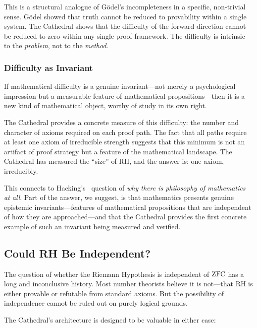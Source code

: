 This is a structural analogue of G\"odel's incompleteness in a
specific, non-trivial sense. G\"odel showed that truth cannot
be reduced to provability within a single system. The Cathedral
shows that the difficulty of the forward direction cannot be
reduced to zero within any single proof framework. The difficulty
is intrinsic to the \emph{problem}, not to the \emph{method}.

\subsubsection{Difficulty as Invariant}

If mathematical difficulty is a genuine invariant---not merely a
psychological impression but a measurable feature of mathematical
propositions---then it is a new kind of mathematical object,
worthy of study in its own right.

The Cathedral provides a concrete measure of this difficulty:
the number and character of axioms required on each proof path.
The fact that all paths require at least one axiom of irreducible
strength suggests that this minimum is not an artifact of proof
strategy but a feature of the mathematical landscape. The
Cathedral has measured the ``size'' of RH, and the answer is:
one axiom, irreducibly.

This connects to Hacking's~\cite{hacking2014} question of
\emph{why there is philosophy of mathematics at all}. Part of
the answer, we suggest, is that mathematics presents genuine
epistemic invariants---features of mathematical propositions
that are independent of how they are approached---and that
the Cathedral provides the first concrete example of such an
invariant being measured and verified.

\subsection{Could RH Be Independent?}

The question of whether the Riemann Hypothesis is independent of
$\mathrm{ZFC}$ has a long and inconclusive history. Most number theorists
believe it is not---that RH is either provable or refutable from
standard axioms. But the possibility of independence cannot be
ruled out on purely logical grounds.

The Cathedral's architecture is designed to be valuable in either
case:

